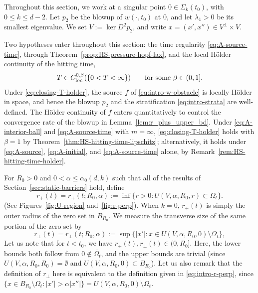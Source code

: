 \documentclass[11pt]{amsart}
\numberwithin{equation}{section}
\numberwithin{figure}{section}
\theoremstyle{plain}
\theoremstyle{definition}
\theoremstyle{remark}
\theoremstyle{plain}
\newcommand{\abs}[1]{\lvert #1 \rvert}
\begin{document}
Throughout this section, we work at a singular point $0\in \Sigma_k(t_0)$, with $0 \leq k \leq d-2$. Let $p_2$ be the blowup of $w(\cdot, t_0)$ at $0$, and let $\lambda_1>0$ be its smallest eigenvalue. We set $V := \ker D^2 p_2$, and write $x = (x',x'')\in V^\perp\times V$.

Two hypotheses enter throughout this section: the time regularity
\eqref{eq:A-source-time}, through Theorem~\ref{prop:HS-pressure-hopf-lax}, and the local
H\"older continuity of the hitting time,
\begin{equation}\label{eq:closing-T-holder}
    T\in C^{0,\beta}_{\operatorname{loc}}(\{0<T<\infty\})
    \qquad\hbox{for some }\beta\in(0,1] .
\end{equation}
Under \eqref{eq:closing-T-holder}, the source $f$ of \eqref{eq:intro-w-obstacle} is locally H\"older in space, and
hence the blowup $p_2$ and the stratification \eqref{eq:intro-strata} are well-defined. The H\"older continuity of $f$
enters quantitatively to control the convergence rate of the blowup in Lemma~\ref{lem:r_plus_upper_bd}.  Under
\eqref{eq:A-interior-ball} and \eqref{eq:A-source-time} with $m=\infty$,
\eqref{eq:closing-T-holder} holds with $\beta=1$ by
Theorem~\ref{thm:HS-hitting-time-lipschitz}; alternatively, it holds under
\eqref{eq:A-source}, \eqref{eq:A-initial}, and \eqref{eq:A-source-time} alone, by
Remark~\ref{rem:HS-hitting-time-holder}.

For $R_0>0$ and $0<\alpha \leq \alpha_0(d,k)$ such that all of the results of Section~\ref{sec:static-barriers} hold, define
\begin{equation}\label{eq:r_plus_def}
    r_+(t) =r_+(t;R_0, \alpha):= \inf \{ r > 0 : U(V, \alpha, R_0,r) \subset \Omega_t\}.
\end{equation}
(See Figures~\ref{fig:U-region} and~\ref{fig:r-perp}). When $k=0$, $r_+(t)$ is simply the outer radius of the zero set in $B_{R_0}$.
We measure the transverse size of the same portion of the zero set by
\begin{equation}\label{eq:r-perp-def}
    r_\perp(t)=r_\perp(t;R_0,\alpha)
    :=\sup\bigl\{\abs{x'}:x\in U(V,\alpha, R_0,0)\setminus\Omega_t\bigr\},
\end{equation}
Let us note that for $t < t_0$, we have $r_+(t), r_\perp(t)\in (0, R_0]$. Here, the lower bounds both follow from $0\notin \overline{\Omega_t}$, and the upper bounds are trivial (since $U(V, \alpha, R_0, R_0) = \emptyset$ and $U(V, \alpha, R_0,0)\subset B_{R_0}$). Let us also remark that the definition of $r_\perp$ here is equivalent to the definition given in \eqref{eq:intro-r-perp}, since $\{ x\in B_{R_0}\setminus \Omega_t: |x'| > \alpha |x''| \} = U(V,\alpha, R_0,0)\setminus\Omega_t$.
\end{document}
